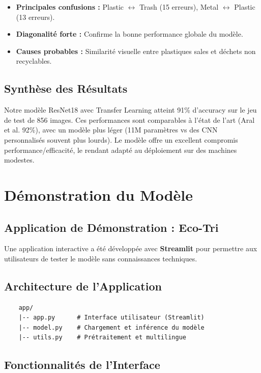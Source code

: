 \documentclass[12pt,a4paper]{report}
\begin{document}
\begin{itemize}
    \item \textbf{Principales confusions :} Plastic $\leftrightarrow$ Trash (15 erreurs), Metal $\leftrightarrow$ Plastic (13 erreurs).
    \item \textbf{Diagonalité forte :} Confirme la bonne performance globale du modèle.
    \item \textbf{Causes probables :} Similarité visuelle entre plastiques sales et déchets non recyclables.
\end{itemize}

\section{Synthèse des Résultats}
Notre modèle ResNet18 avec Transfer Learning atteint 91\% d'accuracy sur le jeu de test de 856 images. Ces performances sont comparables à l'état de l'art (Aral et al. 92\%), avec un modèle plus léger (11M paramètres vs des CNN personnalisés souvent plus lourds). Le modèle offre un excellent compromis performance/efficacité, le rendant adapté au déploiement sur des machines modestes.

\chapter{Démonstration du Modèle}

\section{Application de Démonstration : Eco-Tri}
Une application interactive a été développée avec \textbf{Streamlit} pour permettre aux utilisateurs de tester le modèle sans connaissances techniques.

\section{Architecture de l'Application}
\begin{verbatim}
    app/
    |-- app.py      # Interface utilisateur (Streamlit)
    |-- model.py    # Chargement et inférence du modèle
    |-- utils.py    # Prétraitement et multilingue
\end{verbatim}

\section{Fonctionnalités de l'Interface}
\end{document}
